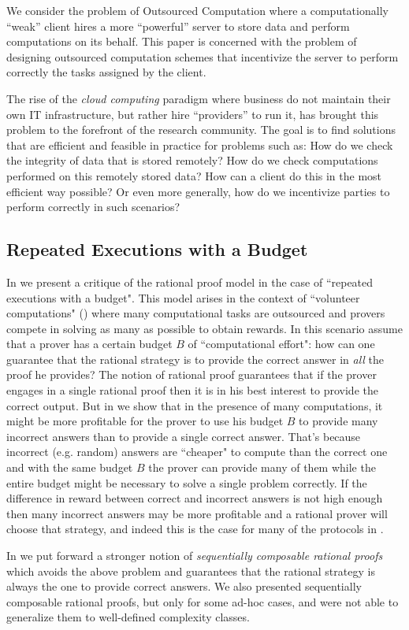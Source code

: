 We consider the problem of {\sf Outsourced Computation} where a computationally  ``weak'' client hires a more  ``powerful'' server to store data and perform computations on its behalf. This paper is concerned with the problem of designing outsourced computation schemes that incentivize the server to perform correctly the tasks assigned by the client. 

The rise of the {\em cloud computing} paradigm where business do not maintain their own IT infrastructure, but rather hire  ``providers'' to run it, has brought this problem to the forefront of the research community. The goal is to find solutions that are efficient and feasible in practice for problems such as: How do we check the integrity of data that is stored remotely? How do we check computations performed on this remotely stored data? How can a client do this in the most efficient way possible? Or even more generally, how do we incentivize parties to perform correctly in such scenarios?



\subsection{Repeated Executions with a Budget}
In \cite{cg15} 
we present a critique of the rational proof model in the case of ``repeated executions with a budget". This model arises in the context of ``volunteer computations" (\cite{seti,folding}) where many computational tasks are outsourced and provers compete in solving as many as possible to obtain rewards. In this scenario assume that a prover has a certain budget $B$ of ``computational effort": how can one  guarantee that the rational strategy is to provide the correct answer in {\em all} the proof he provides? The notion of rational proof guarantees that if the prover engages in a single rational proof then it is in his best interest to provide the correct output. But in \cite{cg15} 
we show that in the presence of many computations, it might be more profitable for the prover to use his budget $B$ to provide many incorrect answers than to provide a single correct answer. That's because incorrect (e.g. random) answers are ``cheaper" to compute than the correct one and with the same budget $B$ the prover can provide many of them while the entire budget might be necessary to solve a single problem correctly. If the difference in reward between correct and incorrect answers is not high enough then many incorrect answers may be more profitable and a rational prover will choose that strategy, and indeed this is the case for many of the protocols in \cite{am,am1,ratargs,ratsumchecks}. 

In \cite{cg15} we put forward a stronger notion of {\em sequentially composable rational proofs} which avoids the above problem and guarantees that the rational strategy is always the one to provide correct answers. We also presented sequentially composable rational proofs, but only for some ad-hoc cases, and were not able to generalize them to well-defined complexity classes. 





